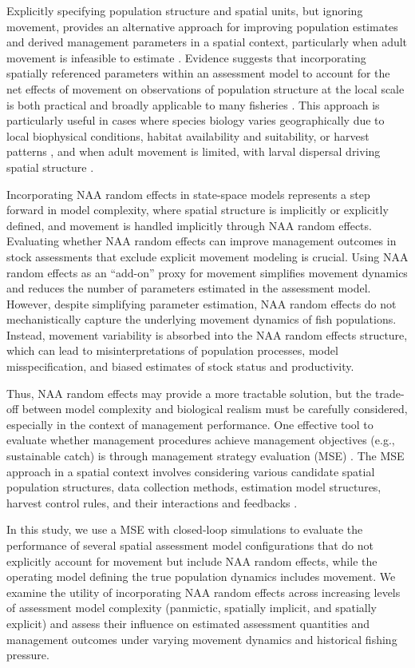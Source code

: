 \documentclass[
  12pt,
]{article}
\begin{document}
Explicitly specifying population structure and spatial units, but
ignoring movement, provides an alternative approach for improving
population estimates and derived management parameters in a spatial
context, particularly when adult movement is infeasible to estimate
\citep{Cadrin2019, Goethel2023}. Evidence suggests that incorporating
spatially referenced parameters within an assessment model to account
for the net effects of movement on observations of population structure
at the local scale is both practical and broadly applicable to many
fisheries \citep{Berger2012, Goethel2023}. This approach is particularly
useful in cases where species biology varies geographically due to local
biophysical conditions, habitat availability and suitability, or harvest
patterns \citep{Goethel2023}, and when adult movement is limited, with
larval dispersal driving spatial structure \citep{Kerr2017}.

Incorporating NAA random effects in state-space models represents a step
forward in model complexity, where spatial structure is implicitly or
explicitly defined, and movement is handled implicitly through NAA
random effects. Evaluating whether NAA random effects can improve
management outcomes in stock assessments that exclude explicit movement
modeling is crucial. Using NAA random effects as an ``add-on'' proxy for
movement simplifies movement dynamics and reduces the number of
parameters estimated in the assessment model. However, despite
simplifying parameter estimation, NAA random effects do not
mechanistically capture the underlying movement dynamics of fish
populations. Instead, movement variability is absorbed into the NAA
random effects structure, which can lead to misinterpretations of
population processes, model misspecification, and biased estimates of
stock status and productivity.

Thus, NAA random effects may provide a more tractable solution, but the
trade-off between model complexity and biological realism must be
carefully considered, especially in the context of management
performance. One effective tool to evaluate whether management
procedures achieve management objectives (e.g., sustainable catch) is
through management strategy evaluation (MSE)
\citep{Punt2017,Keymer2000}. The MSE approach in a spatial context
involves considering various candidate spatial population structures,
data collection methods, estimation model structures, harvest control
rules, and their interactions and feedbacks
\citep{Kerr2014, Goethel2016}.

In this study, we use a MSE with closed-loop simulations to evaluate the
performance of several spatial assessment model configurations that do
not explicitly account for movement but include NAA random effects,
while the operating model defining the true population dynamics includes
movement. We examine the utility of incorporating NAA random effects
across increasing levels of assessment model complexity (panmictic,
spatially implicit, and spatially explicit) and assess their influence
on estimated assessment quantities and management outcomes under varying
movement dynamics and historical fishing pressure.
\end{document}
